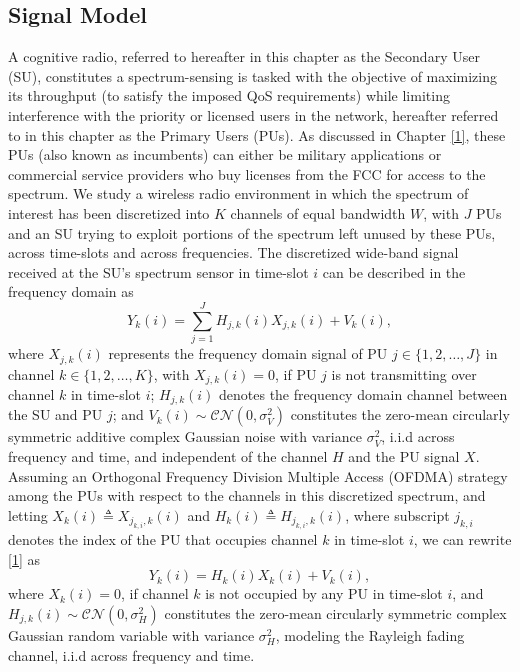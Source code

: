 \subsection{Signal Model}\label{I.I}
A cognitive radio, referred to hereafter in this chapter as the Secondary User (SU), constitutes a spectrum-sensing is tasked with the objective of maximizing its throughput (to satisfy the imposed QoS requirements) while limiting interference with the priority or licensed users in the network, hereafter referred to in this chapter as the Primary Users (PUs). As discussed in Chapter \ref{1}, these PUs (also known as incumbents) can either be military applications or commercial service providers who buy licenses from the FCC for access to the spectrum. We study a wireless radio environment in which the spectrum of interest has been discretized into $K$ channels of equal bandwidth $W$, with $J$ PUs and an SU trying to exploit portions of the spectrum left unused by these PUs, across time-slots and across frequencies. The discretized wide-band signal received at the SU's spectrum sensor in time-slot $i$ can be described in the frequency domain as
\begin{equation}\label{1}
    Y_{k}(i)=\sum_{j{=}1}^{J}{H_{j,k}(i)X_{j,k}(i)+V_{k}(i)},
\end{equation}
where $X_{j,k}(i)$ represents the frequency domain signal of PU $j{\in}\{1,2,\dots,J\}$ in channel $k{\in}\{1,2,\dots,K\}$, with $X_{j,k}(i){=}0$, if PU $j$ is not transmitting over channel $k$ in time-slot $i$; $H_{j,k}(i)$ denotes the frequency domain channel between the SU and PU $j$; and $V_{k}(i){\sim}\mathcal{CN}(0,\sigma_{V}^{2})$ constitutes the zero-mean circularly symmetric additive complex Gaussian noise with variance $\sigma_{V}^{2}$, i.i.d across frequency and time, and independent of the channel $H$ and the PU signal $X$. Assuming an Orthogonal Frequency Division Multiple Access (OFDMA) strategy among the PUs with respect to the channels in this discretized spectrum, and letting $X_{k}(i){\triangleq}X_{j_{k,i},k}(i)$ and $H_{k}(i){\triangleq}H_{j_{k,i},k}(i)$, where subscript $j_{k,i}$ denotes the index of the PU that occupies channel $k$ in time-slot $i$, we can rewrite \eqref{1} as
\begin{equation}\label{2}
    Y_{k}(i)=H_{k}(i)X_{k}(i)+V_{k}(i),
\end{equation}
where $X_{k}(i){=}0$, if channel $k$ is not occupied by any PU in time-slot $i$, and $H_{j,k}(i) \sim \mathcal{CN}(0,\sigma_{H}^{2})$ constitutes the zero-mean circularly symmetric complex Gaussian random variable with variance $\sigma_{H}^{2}$, modeling the Rayleigh fading channel, i.i.d across frequency and time.
